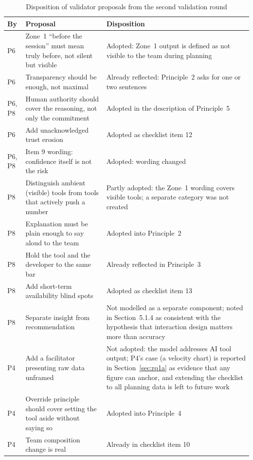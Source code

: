 \documentclass[a4paper,twoside]{bth}
\begin{document}
\begin{table}[htb]
\caption{Disposition of validator proposals from the second validation round}
\label{tab:validation_disposition}
\centering
\small
\begin{tabular}{L{0.7cm} L{5.2cm} L{5.4cm}}
\toprule
By & Proposal & Disposition \\
\midrule
P6 & Zone~1 ``before the session'' must mean truly before, not silent but visible & Adopted: Zone~1 output is defined as not visible to the team during planning \\
P6 & Transparency should be enough, not maximal & Already reflected: Principle~2 asks for one or two sentences \\
P6, P8 & Human authority should cover the reasoning, not only the commitment & Adopted in the description of Principle~5 \\
P6 & Add unacknowledged trust erosion & Adopted as checklist item 12 \\
P6, P8 & Item 9 wording: confidence itself is not the risk & Adopted: wording changed \\
P8 & Distinguish ambient (visible) tools from tools that actively push a number & Partly adopted: the Zone~1 wording covers visible tools; a separate category was not created \\
P8 & Explanation must be plain enough to say aloud to the team & Adopted into Principle~2 \\
P8 & Hold the tool and the developer to the same bar & Already reflected in Principle~3 \\
P8 & Add short-term availability blind spots & Adopted as checklist item 13 \\
P8 & Separate insight from recommendation & Not modelled as a separate component; noted in Section~5.1.4 as consistent with the hypothesis that interaction design matters more than accuracy \\
P4 & Add a facilitator presenting raw data unframed & Not adopted: the model addresses AI tool output; P4's case (a velocity chart) is reported in Section~\ref{sec:rq1a} as evidence that any figure can anchor, and extending the checklist to all planning data is left to future work \\
P4 & Override principle should cover setting the tool aside without saying so & Adopted into Principle~4 \\
P4 & Team composition change is real & Already in checklist item 10 \\
\bottomrule
\end{tabular}
\end{table}
\end{document}
